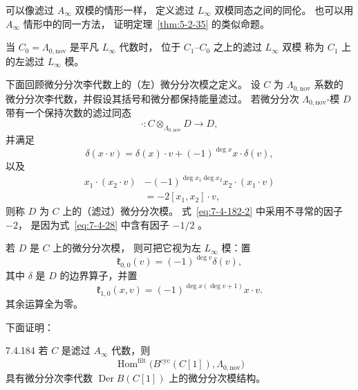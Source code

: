 可以像滤过 $A_\infty$ 双模的情形一样，
定义滤过 $L_\infty$ 双模同态之间的同伦。
也可以用 $A_\infty$ 情形中的同一方法，
证明定理~\ref{thm:5-2-35} 的类似命题。

当 $C_0=\Lambda_{0,\mathrm{nov}}$
是平凡 $L_\infty$ 代数时，
位于 $C_1$--$C_0$ 之上的滤过 $L_\infty$ 双模
称为 $C_1$ 上的左滤过 $L_\infty$ 模。

下面回顾微分分次李代数上的（左）微分分次模之定义。
设 $C$ 为 $\Lambda_{0,\mathrm{nov}}$ 系数的
微分分次李代数，并假设其括号和微分都保持能量滤过。
若微分分次 $\Lambda_{0,\mathrm{nov}}$-模 $D$
带有一个保持次数的滤过同态
\[
\mathbin{\cdot}\colon
C\otimes_{\Lambda_{0,\mathrm{nov}}}D\longrightarrow D,
\]
并满足
\begin{equation}
\delta(x\mathbin{\cdot}v)
=\delta(x)\mathbin{\cdot}v
+(-1)^{\deg x}x\mathbin{\cdot}\delta(v),
\tag{7.4.182.1}\label{eq:7-4-182-1}
\end{equation}
以及
\begin{equation}
\begin{aligned}
x_1\mathbin{\cdot}(x_2\mathbin{\cdot}v)
&-(-1)^{\deg x_1\deg x_2}
x_2\mathbin{\cdot}(x_1\mathbin{\cdot}v)\\
&=-2[x_1,x_2]\mathbin{\cdot}v,
\end{aligned}
\tag{7.4.182.2}\label{eq:7-4-182-2}
\end{equation}
则称 $D$ 为 $C$ 上的（滤过）微分分次模。
式~\eqref{eq:7-4-182-2} 中采用不寻常的因子 $-2$，
是因为式~\eqref{eq:7-4-28} 中含有因子 $-1/2$
。

若 $D$ 是 $C$ 上的微分分次模，
则可把它视为左 $L_\infty$ 模：置
\begin{equation}
\mathfrak k_{0,0}(v)
=(-1)^{\deg v}\delta(v),
\tag{7.4.183.1}\label{eq:7-4-183-1}
\end{equation}
其中 $\delta$ 是 $D$ 的边界算子，并置
\begin{equation}
\mathfrak k_{1,0}(x,v)
=(-1)^{\deg x(\deg v+1)}x\mathbin{\cdot}v.
\tag{7.4.183.2}\label{eq:7-4-183-2}
\end{equation}
其余运算全为零。

下面证明：

\begin{proposition}{7.4.184}\label{prop:7-4-184}
若 $C$ 是滤过 $A_\infty$ 代数，则
\[
\operatorname{Hom}^{\mathrm{filt}}
\bigl(B^{\mathrm{cyc}}(C[1]),\Lambda_{0,\mathrm{nov}}\bigr)
\]
具有微分分次李代数
$\operatorname{Der}B(C[1])$ 上的微分分次模结构。
\end{proposition}

